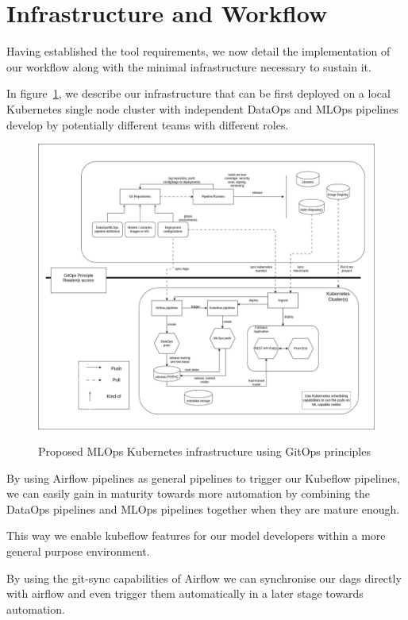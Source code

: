 \section{Infrastructure and Workflow}\label{sec:infrastructure}

Having established the tool requirements, we now detail the implementation of our workflow along with the minimal infrastructure necessary to sustain it.

In figure~\ref{fig:project-infra}, we describe our infrastructure that can be first deployed on a local Kubernetes single node cluster
with independent DataOps and MLOps pipelines develop by potentially different teams with different roles.

\begin{figure}[!htbp]
    \centering
    \caption{Proposed MLOps Kubernetes infrastructure using GitOps principles}
    \includegraphics[scale=0.35]{images/project/mthmlops-infra}
    \label{fig:project-infra}
\end{figure}

By using Airflow pipelines as general pipelines to trigger our Kubeflow pipelines, we can easily gain in maturity towards
more automation by combining the DataOps pipelines and MLOps pipelines together when they are mature enough.

This way we enable kubeflow features for our model developers within a more general purpose environment.

By using the git-sync capabilities of Airflow we can synchronise our dags directly with airflow and
even trigger them automatically in a later stage towards automation.

